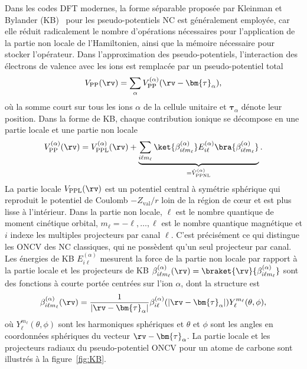 Dans les codes DFT modernes, la forme séparable proposée par Kleinman et Bylander (KB)~\cite{kleinmanEfficaciousFormModel1982} pour les pseudo-potentiels NC est généralement employée, car elle réduit radicalement le nombre d'opérations nécessaires pour l'application de la partie non locale de l'Hamiltonien, ainsi que la mémoire nécessaire pour stocker l'opérateur. Dans l'approximation des pseudo-potentiels, l'interaction des électrons de valence avec les ions est remplacée par un pseudo-potentiel total
\begin{equation}
    V_\text{PP}(\rv)=\sum_\alpha V_\text{PP}^{(\alpha)}(\rv-\bm{\tau}_\alpha),
    \label{eqn:c2_pp_approx}
\end{equation}
où la somme court sur tous les ions $\alpha$ de la cellule unitaire et $\bm{\tau}_\alpha$ dénote leur position. Dans la forme de KB, chaque contribution ionique se décompose en une partie locale et une partie non locale
\begin{equation}
    V^{(\alpha)}_\text{PP}(\rv) = V^{(\alpha)}_\text{PPL}(\rv)+\underbrace{\sum_{i\ell m_\ell}\ket{\beta_{i\ell m_\ell}^{(\alpha)}}E_{i\ell}^{(\alpha)}\bra{\beta_{i\ell m_\ell}^{(\alpha)}}}_{=\hat{V}_\text{PPNL}^{(\alpha)}}.
    \label{eqn:c2_VKB}
\end{equation}
La partie locale $V_\text{PPL}(\rv)$ est un potentiel central à symétrie sphérique qui reproduit le potentiel de Coulomb $-Z_\text{val}/r$ loin de la région de c\oe ur et est plus lisse à l'intérieur. Dans la partie non locale, $\ell$ est le nombre quantique de moment cinétique orbital, $m_\ell=-\ell,\dots,\ell$ est le nombre quantique magnétique et $i$ indexe les multiples projecteurs par canal $\ell$. C'est précisément ce qui distingue les ONCV des NC classiques, qui ne possèdent qu'un seul projecteur par canal. Les énergies de KB $E_{i\ell}^{(\alpha)}$ mesurent la force de la partie non locale par rapport à la partie locale et les projecteurs de KB $\beta_{i\ell m_\ell}^{(\alpha)}(\rv)=\braket{\rv}{\beta_{i\ell m_\ell}^{(\alpha)}}$ sont des fonctions à courte portée centrées sur l'ion $\alpha$, dont la structure est
\begin{equation}
    \beta_{i\ell m_\ell}^{(\alpha)}(\rv)=\frac{1}{|\rv-\bm{\tau}_\alpha|}\beta_{i\ell}^{(\alpha)}(|\rv-\bm{\tau}_\alpha|)Y_{\ell}^{m_\ell}(\theta,\phi),
    \label{eqn:betar}
\end{equation}
où $Y_\ell^{m_\ell}(\theta, \phi)$ sont les harmoniques sphériques et $\theta$ et $\phi$ sont les angles en coordonnées sphériques du vecteur $\rv-\bm{\tau}_\alpha$. La partie locale et les projecteurs radiaux du pseudo-potentiel ONCV pour un atome de carbone sont illustrés à la figure~\ref{fig:KB}.


